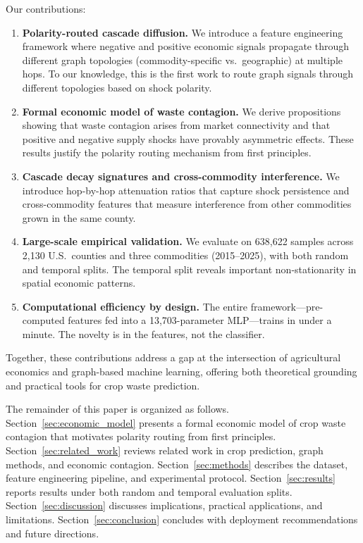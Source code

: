 \documentclass[preprint,12pt,authoryear]{elsarticle}
\begin{document}
Our contributions:

\begin{enumerate}[leftmargin=*]
    \item \textbf{Polarity-routed cascade diffusion.} We introduce a feature engineering framework where negative and positive economic signals propagate through different graph topologies (commodity-specific vs.\ geographic) at multiple hops. To our knowledge, this is the first work to route graph signals through different topologies based on shock polarity.

    \item \textbf{Formal economic model of waste contagion.} We derive propositions showing that waste contagion arises from market connectivity and that positive and negative supply shocks have provably asymmetric effects. These results justify the polarity routing mechanism from first principles.

    \item \textbf{Cascade decay signatures and cross-commodity interference.} We introduce hop-by-hop attenuation ratios that capture shock persistence and cross-commodity features that measure interference from other commodities grown in the same county.

    \item \textbf{Large-scale empirical validation.} We evaluate on 638,622 samples across 2,130 U.S.\ counties and three commodities (2015--2025), with both random and temporal splits. The temporal split reveals important non-stationarity in spatial economic patterns.

    \item \textbf{Computational efficiency by design.} The entire framework---pre-computed features fed into a 13,703-parameter MLP---trains in under a minute. The novelty is in the features, not the classifier.
\end{enumerate}

Together, these contributions address a gap at the intersection of agricultural economics and graph-based machine learning, offering both theoretical grounding and practical tools for crop waste prediction.

The remainder of this paper is organized as follows. Section~\ref{sec:economic_model} presents a formal economic model of crop waste contagion that motivates polarity routing from first principles. Section~\ref{sec:related_work} reviews related work in crop prediction, graph methods, and economic contagion. Section~\ref{sec:methods} describes the dataset, feature engineering pipeline, and experimental protocol. Section~\ref{sec:results} reports results under both random and temporal evaluation splits. Section~\ref{sec:discussion} discusses implications, practical applications, and limitations. Section~\ref{sec:conclusion} concludes with deployment recommendations and future directions.
\end{document}
